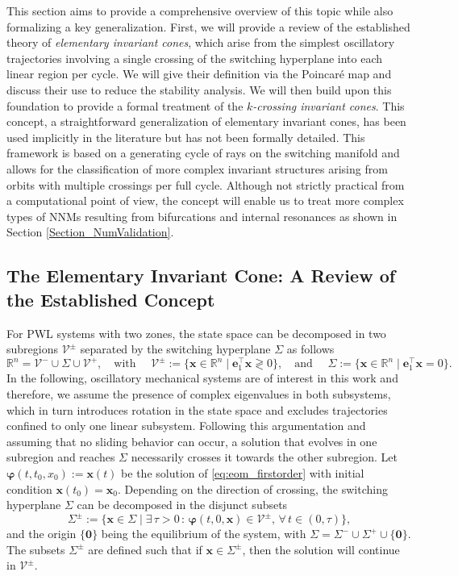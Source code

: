 \documentclass[a4paper,9pt,parskip=half,english]{article}
\theoremstyle{plain}
\theoremstyle{definition}
\newcommand{\T}{^{\!\top}} %
\newcommand{\mR}{\mathbb{R}}
\newcommand{\vph}{\bm{\varphi}}
\newcommand{\ve}{\mathbf e}
\newcommand{\vx}{\mathbf x}
\newcommand{\cV}{\mathcal{V}}
\newcommand{\cVplus}{\mathcal{V}^+}
\newcommand{\cVminus}{\mathcal{V}^-}
\begin{document}
This section aims to provide a comprehensive overview of this topic while also formalizing a key generalization. First, we will provide a review of the established theory of \textit{elementary invariant cones}, which arise from the simplest oscillatory trajectories involving a single crossing of the switching hyperplane into each linear region per cycle. We will give their definition via the Poincaré map and discuss their use to reduce the stability analysis.
We will then build upon this foundation to provide a formal treatment of the \textit{$k$-crossing invariant cones}. This concept, a straightforward generalization of elementary invariant cones, has been used implicitly in the literature \cite{Kuepper2013} but has not been formally detailed. This framework is based on a generating cycle of rays on the switching manifold and allows for the classification of more complex invariant structures arising from orbits with multiple crossings per full cycle. Although not strictly practical from a computational point of view, the concept will enable us to treat more complex types of NNMs resulting from bifurcations and internal resonances as shown in Section \ref{Section_NumValidation}. 
\subsection{The Elementary Invariant Cone: A Review of the Established Concept}
For PWL systems with two zones, the state space can be decomposed in two subregions $\cV^\pm$ separated by the switching hyperplane $\Sigma$ as follows
\begin{equation}
	\mR^n = \cVminus \cup \Sigma \cup \cVplus, \quad \mbox{with } \quad  \cV^\pm := \{ \vx \in \mR^n \mid \ve_1\T \vx \gtrless 0 \}, \quad \mbox{and } \quad  \Sigma := \{ \vx \in \mR^n \mid \ve_1\T \vx = 0 \}. \nonumber 
\end{equation}
In the following, oscillatory mechanical systems are of interest in this work and therefore, we assume the presence of complex eigenvalues in both subsystems, which in turn introduces rotation in the state space and excludes trajectories confined to only one linear subsystem. Following this argumentation and assuming that no sliding behavior can occur, a solution that evolves in one subregion and reaches $\Sigma$ necessarily crosses it towards the other subregion. Let $\vph(t,t_0,x_0) := \vx(t)$ be the solution of \eqref{eq:eom_firstorder} with initial condition $\vx(t_0)= \vx_0$.
Depending on the direction of crossing, the switching hyperplane $\Sigma$ can be decomposed in the disjunct subsets 
\begin{equation}
	\Sigma^\pm := \{ \vx \in \Sigma \mid \exists \, \tau > 0 \, : \, \vph(t,0,\vx) \in \cV^\pm, \, \forall \,  t \in (0,\tau) \},
\end{equation}
and the origin $\{\bm{0}\}$ being the equilibrium of the system, with $\Sigma = \Sigma^- \cup \Sigma^+ \cup \{\bm{0}\}$. The subsets $\Sigma^\pm$ are defined such that if $\vx \in \Sigma^\pm$, then the solution will continue in $\cV^\pm$.  
\end{document}
